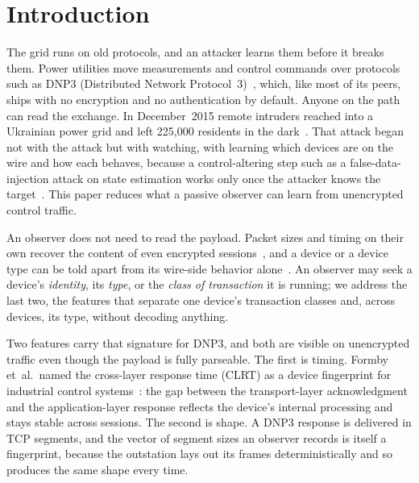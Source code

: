 \documentclass[conference]{IEEEtran}
\begin{document}
\section{Introduction}
\label{sec:intro}

The grid runs on old protocols, and an attacker learns them before it breaks them. Power utilities
move measurements and control commands over protocols such as DNP3 (Distributed Network
Protocol~3)~\cite{dnp3std}, which, like most of its peers, ships with no encryption and no
authentication by default. Anyone on the path can read the exchange. In December~2015 remote intruders
reached into a Ukrainian power grid and left 225{,}000 residents in the
dark~\cite{ukraine2015}. That attack began not with the attack but with watching, with learning which
devices are on the wire and how each behaves, because a control-altering step such as a
false-data-injection attack on state estimation works only once the attacker knows the
target~\cite{liufdia2009,cardenas2011}. This paper reduces what a passive observer can learn from
unencrypted control traffic.

An observer does not need to read the payload. Packet sizes and timing on their own recover the
content of even encrypted sessions~\cite{sirinam2018,feghhi2016}, and a device or a device type can be
told apart from its wire-side behavior alone~\cite{kohno2005,gtid2015}. An observer may seek a device's
\emph{identity}, its \emph{type}, or the \emph{class of transaction} it is running; we address the last
two, the features that separate one device's transaction classes and, across devices, its type,
without decoding anything.

Two features carry that signature for DNP3, and both are visible on unencrypted traffic even though
the payload is fully parseable. The first is timing. Formby et~al.\ named the cross-layer response
time (CLRT) as a device fingerprint for industrial control systems~\cite{formby2016}: the gap between
the transport-layer acknowledgment and the application-layer response reflects the device's internal
processing and stays stable across sessions. The second is shape. A DNP3 response is delivered in TCP
segments, and the vector of segment sizes an observer records is itself a fingerprint, because the
outstation lays out its frames deterministically and so produces the same shape every time.
\end{document}
